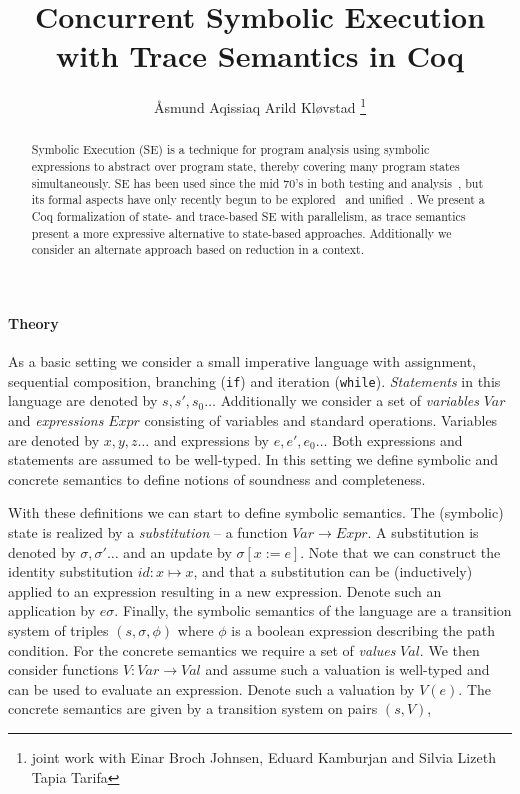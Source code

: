 \documentclass[submission,copyright,creativecommons]{eptcs}
\title{Concurrent Symbolic Execution with Trace Semantics in Coq}
\author{Åsmund Aqissiaq Arild Kløvstad
  \footnote{joint work with Einar Broch Johnsen, Eduard Kamburjan and Silvia Lizeth Tapia Tarifa}
\institute{University of Oslo, Oslo, Norway}
\email{aaklovst@ifi.uio.no}
}
\begin{document}
\maketitle

\begin{abstract}
  Symbolic Execution (SE) is a technique for program analysis using symbolic expressions to abstract over program state,
  thereby covering many program states simultaneously. SE has been used since the mid 70's in both testing and analysis~\cite{king1976symbolic, boyer1975select},
  but its formal aspects have only recently begun to be explored~\cite{boer2021} and unified~\cite{Steinhoefel2022}.
  We present a Coq formalization of state- and trace-based SE with parallelism, as trace semantics present
  a more expressive alternative to state-based approaches.
  Additionally we consider an alternate approach based on reduction in a context.
\end{abstract}

\paragraph{Theory~\cite{boer2021}}
As a basic setting we consider a small imperative language with assignment,
sequential composition, branching (\texttt{if}) and iteration (\texttt{while}).
\emph{Statements} in this language are denoted by $s, s', s_{0}\ldots$
Additionally we consider a set of \emph{variables} $Var$ and \emph{expressions} $Expr$ consisting of variables and
standard operations. Variables are denoted by $x,y,z\ldots$ and expressions by $e, e', e_{0}\ldots$
Both expressions and statements are assumed to be well-typed.
In this setting we define symbolic and concrete semantics to define notions of soundness and completeness.

With these definitions we can start to define symbolic semantics. The (symbolic) state is realized by a
\emph{substitution} -- a function $Var \rightarrow Expr$. A substitution is denoted by $\sigma, \sigma'\ldots$
and an update by $\sigma[x := e]$. Note that we can construct the identity substitution $id : x \mapsto x$,
and that a substitution can be (inductively) applied to an expression resulting
in a new expression. Denote such an application by $e\sigma$.
Finally, the symbolic semantics of the language are a transition system of triples $(s, \sigma, \phi)$
where $\phi$ is a boolean expression describing the path condition.
For the concrete semantics we require a set of \emph{values} $Val$. We then consider functions $V : Var \rightarrow Val$
and assume such a valuation is well-typed and can be used to evaluate an expression. Denote such a valuation by $V(e)$.
The concrete semantics are given by a transition system on pairs $(s, V)$,
\end{document}
